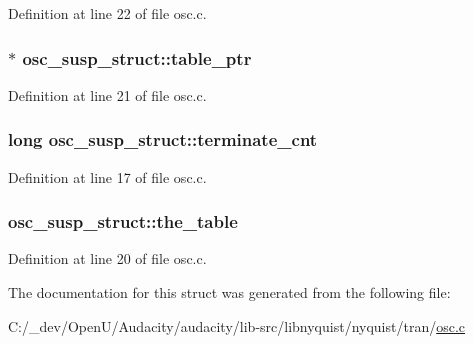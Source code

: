 Definition at line 22 of file osc.\+c.

\subsubsection[{\texorpdfstring{table\+\_\+ptr}{table_ptr}}]{$\ast$ osc\+\_\+susp\+\_\+struct\+::table\+\_\+ptr}\hypertarget{structosc__susp__struct_a7ef57da5933f674729a56fba0e9e6b26}{}\label{structosc__susp__struct_a7ef57da5933f674729a56fba0e9e6b26}


Definition at line 21 of file osc.\+c.

\subsubsection[{\texorpdfstring{terminate\+\_\+cnt}{terminate_cnt}}]{\setlength{\rightskip}{0pt plus 5cm}long osc\+\_\+susp\+\_\+struct\+::terminate\+\_\+cnt}\hypertarget{structosc__susp__struct_a98e8e78e0f225b39f83fee67180650b9}{}\label{structosc__susp__struct_a98e8e78e0f225b39f83fee67180650b9}


Definition at line 17 of file osc.\+c.

\subsubsection[{\texorpdfstring{the\+\_\+table}{the_table}}]{ osc\+\_\+susp\+\_\+struct\+::the\+\_\+table}\hypertarget{structosc__susp__struct_a29ef206ee2958a28ddbef22ac8d82658}{}\label{structosc__susp__struct_a29ef206ee2958a28ddbef22ac8d82658}


Definition at line 20 of file osc.\+c.



The documentation for this struct was generated from the following file\+:\begin{DoxyCompactItemize}
\item 
C\+:/\+\_\+dev/\+Open\+U/\+Audacity/audacity/lib-\/src/libnyquist/nyquist/tran/\hyperlink{osc_8c}{osc.\+c}\end{DoxyCompactItemize}
